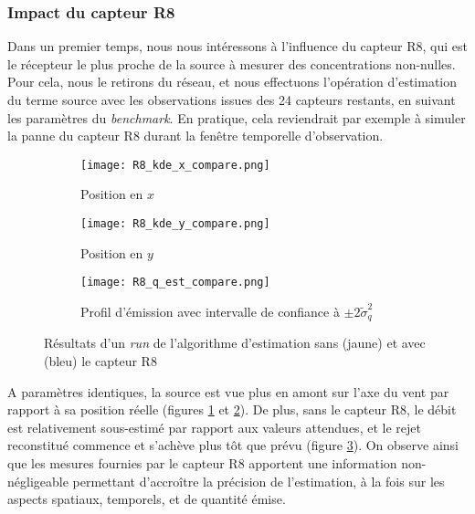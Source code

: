 \subsubsection{Impact du capteur R8}

Dans un premier temps, nous nous intéressons à l'influence du capteur R8, qui est le récepteur le plus proche de la source à mesurer des concentrations non-nulles. Pour cela, nous le retirons du réseau, et nous effectuons l'opération d'estimation du terme source avec les observations issues des 24 capteurs restants, en suivant les paramètres du \textit{benchmark}. En pratique, cela reviendrait par exemple à simuler la panne du capteur R8 durant la fenêtre temporelle d'observation.\\


\begin{figure}[h!]
	\centering
	\begin{subfigure}[t]{0.5\textwidth}
		\centering
		\texttt{[image: R8\_kde\_x\_compare.png]}
		\caption{Position en $x$}
		\label{R8_x}
	\end{subfigure}%
	\begin{subfigure}[t]{0.5\textwidth}
		\centering
		\texttt{[image: R8\_kde\_y\_compare.png]}
		\caption{Position en $y$}
		\label{R8_y}
	\end{subfigure}
	\begin{subfigure}[t]{0.65\textwidth}
		\centering
		\texttt{[image: R8\_q\_est\_compare.png]}
		\caption{Profil d'émission avec intervalle de confiance à  $\pm 2 \tilde{\sigma}_q^2$}
		\label{R8_q}
	\end{subfigure} 
	\caption{Résultats d'un \textit{run} de l'algorithme d'estimation sans (jaune) et avec (bleu) le capteur R8}
	\label{fig_R8_compare}
\end{figure}

A paramètres identiques, la source est vue plus en amont sur l'axe du vent par rapport à sa position réelle (figures \ref{R8_x} et \ref{R8_y}). De plus, sans le capteur R8, le débit est relativement sous-estimé par rapport aux valeurs attendues, et le rejet reconstitué commence et s'achève plus tôt que prévu (figure \ref{R8_q}). On observe ainsi que les mesures fournies par le capteur R8 apportent une information non-négligeable permettant d'accroître la précision de l'estimation, à la fois sur les aspects spatiaux, temporels, et de quantité émise. 


